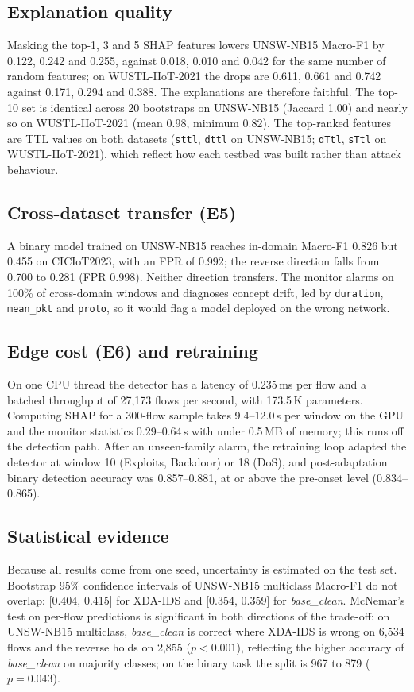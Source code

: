 \documentclass[pdflatex,sn-mathphys-num]{sn-jnl}%
\begin{document}
\subsection{Explanation quality}
Masking the top-1, 3 and 5 SHAP features lowers UNSW-NB15 Macro-F1 by 0.122, 0.242 and 0.255, against 0.018, 0.010 and 0.042 for the same number of random features; on WUSTL-IIoT-2021 the drops are 0.611, 0.661 and 0.742 against 0.171, 0.294 and 0.388. The explanations are therefore faithful. The top-10 set is identical across 20 bootstraps on UNSW-NB15 (Jaccard 1.00) and nearly so on WUSTL-IIoT-2021 (mean 0.98, minimum 0.82). The top-ranked features are TTL values on both datasets (\texttt{sttl}, \texttt{dttl} on UNSW-NB15; \texttt{dTtl}, \texttt{sTtl} on WUSTL-IIoT-2021), which reflect how each testbed was built rather than attack behaviour.

\subsection{Cross-dataset transfer (E5)}
A binary model trained on UNSW-NB15 reaches in-domain Macro-F1 0.826 but 0.455 on CICIoT2023, with an FPR of 0.992; the reverse direction falls from 0.700 to 0.281 (FPR 0.998). Neither direction transfers. The monitor alarms on 100\% of cross-domain windows and diagnoses concept drift, led by \texttt{duration}, \texttt{mean\_pkt} and \texttt{proto}, so it would flag a model deployed on the wrong network.

\subsection{Edge cost (E6) and retraining}
On one CPU thread the detector has a latency of 0.235\,ms per flow and a batched throughput of 27{,}173 flows per second, with 173.5\,K parameters. Computing SHAP for a 300-flow sample takes 9.4--12.0\,s per window on the GPU and the monitor statistics 0.29--0.64\,s with under 0.5\,MB of memory; this runs off the detection path. After an unseen-family alarm, the retraining loop adapted the detector at window 10 (Exploits, Backdoor) or 18 (DoS), and post-adaptation binary detection accuracy was 0.857--0.881, at or above the pre-onset level (0.834--0.865).

\subsection{Statistical evidence}
Because all results come from one seed, uncertainty is estimated on the test set. Bootstrap 95\% confidence intervals of UNSW-NB15 multiclass Macro-F1 do not overlap: [0.404, 0.415] for XDA-IDS and [0.354, 0.359] for \textit{base\_clean}. McNemar's test on per-flow predictions is significant in both directions of the trade-off: on UNSW-NB15 multiclass, \textit{base\_clean} is correct where XDA-IDS is wrong on 6{,}534 flows and the reverse holds on 2{,}855 ($p<0.001$), reflecting the higher accuracy of \textit{base\_clean} on majority classes; on the binary task the split is 967 to 879 ($p=0.043$).
\end{document}
